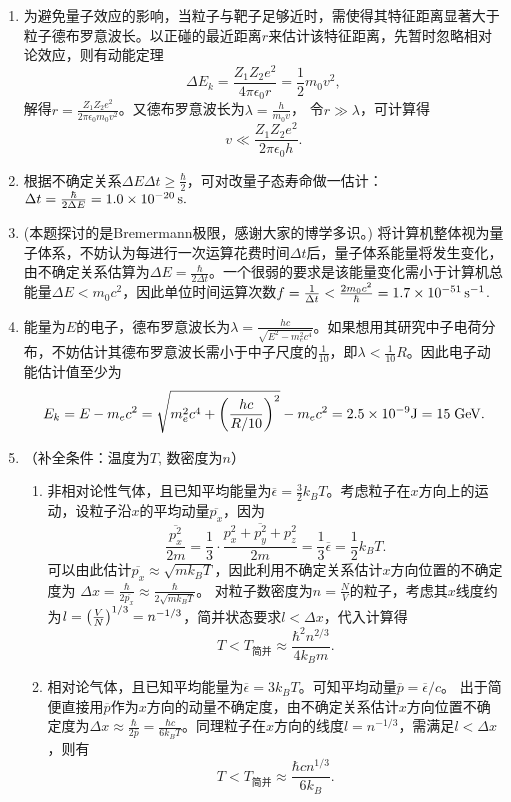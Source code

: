 \begin{enumerate}[label=2.\arabic*, leftmargin=-0.5mm]
\item
为避免量子效应的影响，当粒子与靶子足够近时，需使得其特征距离显著大于粒子德布罗意波长。以正碰的最近距离$r$来估计该特征距离，先暂时忽略相对论效应，则有动能定理
\[\Delta E_k=\frac{Z_1Z_2e^2}{4\pi\epsilon_0r}=\frac{1}{2}m
_0v^2,\]
解得$r=\frac{Z_1Z_2 e^2}{2\pi\epsilon_0 m_0v^2}$。又德布罗意波长为$\lambda = \frac{h}{m_0v}$，
令$r\gg\lambda$，可计算得
\[v\ll\frac{Z_1Z_2 e^2}{2\pi\epsilon_0 h}.\]

\item
根据不确定关系$\Delta E\Delta t\geq\frac{\hbar}{2}$，可对改量子态寿命做一估计：$\Delta t=\frac{\hbar}{2\Delta E}=1.0\times 10^{-20}\,\mathrm{s}.$

\item
(本题探讨的是Bremermann极限，感谢大家的博学多识。) 将计算机整体视为量子体系，不妨认为每进行一次运算花费时间$\Delta t$后，量子体系能量将发生变化，由不确定关系估算为$\Delta E=\frac{\hbar}{2\Delta t}$。一个很弱的要求是该能量变化需小于计算机总能量$\Delta E < m_0c^2$，因此单位时间运算次数$f=\frac{1}{\Delta t}<\frac{2m_0 c^2}{\hbar}=1.7\times 10^{-51}\,\mathrm{s^{-1}}$.

\item
能量为$E$的电子，德布罗意波长为$\lambda=\frac{hc}{\sqrt{E^2-m_e^2c^4}}$。如果想用其研究中子电荷分布，不妨估计其德布罗意波长需小于中子尺度的$\frac{1}{10}$，即$\lambda<\frac{1}{10}R$。因此电子动能估计值至少为
\[E_k = E-m_ec^2 = \sqrt{m_e^2c^4+\qty(\frac{hc}{R/10})^2}-m_ec^2 = 2.5\times 10^{-9}\mathrm{J}=15\;\mathrm{GeV}.\]

\item
（补全条件：温度为$T$, 数密度为$n$）

\begin{enumerate}[label=(\arabic*)]
\item 非相对论性气体，且已知平均能量为$\overline{\epsilon}=\frac{3}{2}k_B T$。考虑粒子在$x$方向上的运动，设粒子沿$x$的平均动量$\overline{p_x}$，因为
\[\frac{\overline{p_x^2}}{2m}
=\frac{1}{3}\cdot\frac{\overline{p_x^2+p_y^2+p_z^2}}{2m}
=\frac{1}{3} \overline{\epsilon}=\frac{1}{2}k_B T.\]
可以由此估计$\overline{p_x}\approx \sqrt{mk_B T}$，因此利用不确定关系估计$x$方向位置的不确定度为
$\Delta x = \frac{\hbar}{2\overline{p_x}}\approx\frac{\hbar}{2\sqrt{mk_B T}}$。
对粒子数密度为$n=\frac{N}{V}$的粒子，考虑其$x$线度约为$l=\qty(\frac{V}{N})^{1/3}=n^{-1/3}$，简并状态要求$l<\Delta x$，代入计算得
\[T<T_{\text{简并}}\approx\frac{\hbar^2 n^{2/3}}{4 k_B m}.\]

\item 相对论气体，且已知平均能量为$\overline{\epsilon}=3k_B T$。可知平均动量$\overline{p}=\overline{\epsilon}/c$。
出于简便直接用$\overline{p}$作为$x$方向的动量不确定度，由不确定关系估计$x$方向位置不确定度为$\Delta x\approx \frac{\hbar}{2\overline{p}}=\frac{\hbar c}{6k_B T}$。同理粒子在$x$方向的线度$l=n^{-1/3}$，需满足$l<\Delta x $，则有
\[T<T_{\text{简并}}\approx\frac{\hbar c n^{1/3}}{6k_B}.\]
\end{enumerate}


\end{enumerate}
